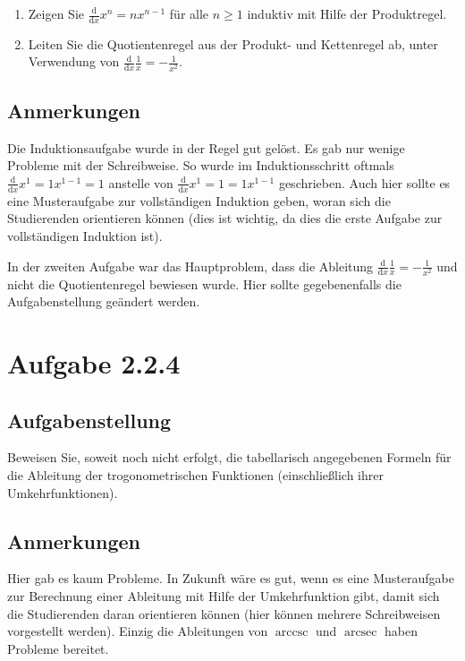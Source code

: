 \documentclass[a4paper]{article}
\begin{document}
\begin{enumerate}
  \item Zeigen Sie $\frac{\mathrm d}{\mathrm dx} x^n = nx^{n-1}$ für alle $n\ge 1$ induktiv mit Hilfe der Produktregel.
  \item Leiten Sie die Quotientenregel aus der Produkt- und Kettenregel ab, unter Verwendung von $\frac{\mathrm d}{\mathrm dx} \frac 1x = -\frac 1{x^2}$.
\end{enumerate}

\subsection{Anmerkungen}

Die Induktionsaufgabe wurde in der Regel gut gelöst. Es gab nur wenige Probleme mit der Schreibweise. So wurde im Induktionsschritt oftmals $\frac{\mathrm d}{\mathrm dx} x^1 = 1x^{1-1}=1$ anstelle von $\frac{\mathrm d}{\mathrm dx} x^1 =1= 1x^{1-1}$ geschrieben. Auch hier sollte es eine Musteraufgabe zur vollständigen Induktion geben, woran sich die Studierenden orientieren können (dies ist wichtig, da dies die erste Aufgabe zur vollständigen Induktion ist).

In der zweiten Aufgabe war das Hauptproblem, dass die Ableitung $\frac{\mathrm d}{\mathrm dx} \frac 1x = -\frac 1{x^2}$ und nicht die Quotientenregel bewiesen wurde. Hier sollte gegebenenfalls die Aufgabenstellung geändert werden.

\section{Aufgabe 2.2.4}

\subsection{Aufgabenstellung}

Beweisen Sie, soweit noch nicht erfolgt, die tabellarisch angegebenen Formeln für die Ableitung der trogonometrischen Funktionen (einschließlich ihrer Umkehrfunktionen).

\subsection{Anmerkungen}

Hier gab es kaum Probleme. In Zukunft wäre es gut, wenn es eine Musteraufgabe zur Berechnung einer Ableitung mit Hilfe der Umkehrfunktion gibt, damit sich die Studierenden daran orientieren können (hier können mehrere Schreibweisen vorgestellt werden). Einzig die Ableitungen von $\operatorname{arccsc}$ und $\operatorname{arcsec}$ haben Probleme bereitet.
\end{document}
